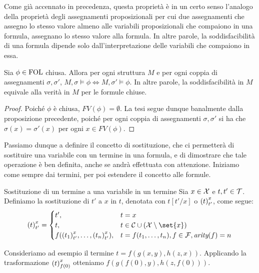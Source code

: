 Come già accennato in precedenza, questa proprietà è in un certo senso l'analogo della proprietà degli assegnamenti proposizionali per cui due assegnamenti che assegno lo stesso valore almeno alle variabili proposizionali che compaiono in una formula, assegnano lo stesso valore alla formula. In altre parole, la soddisfacibilità di una formula dipende solo dall'interpretazione delle variabili che compaiono in essa.

\begin{corollary}{}
  Sia \(\phi\in\FOL\) chiusa. Allora per ogni struttura \(M\) e per ogni coppia di assegnamenti \(\sigma, \sigma'\),  \(M,\sigma\models \phi \iff M,\sigma'\models \phi\). In altre parole, la soddisfacibilità in \(M\) equivale alla verità in \(M\) per le formule chiuse.
\end{corollary}

\begin{proof}
  Poiché \(\phi\) è chiusa, \(FV(\phi) = \emptyset\). La tesi segue dunque banalmente dalla proposizione precedente, poiché per ogni coppia di assegnamenti \(\sigma, \sigma'\) si ha che \(\sigma(x) = \sigma'(x)\) per ogni \(x \in FV(\phi)\).
\end{proof}

Passiamo dunque a definire il concetto di sostituzione, che ci permetterà di sostituire una variabile con un termine in una formula, e di dimostrare che tale operazione è ben definita, anche se andrà effettuata con attenzione. Iniziamo come sempre dai termini, per poi estendere il concetto alle formule.

\begin{definition}{Sostituzione di un termine a una variabile in un termine}
  Sia \(x\in\mathcal{X}\) e \(t,t' \in \mathcal{T}\). Definiamo la sostituzione di \(t'\) a \(x\) in \(t\), denotata con \(t[t'/x]\) o \({{\left(t\right)}^{x}_{t'}}\), come segue:
  \[\subs{t}{x}{t'} = \begin{cases}
    t', & t = x\\
    t, & t \in \ConstSyms \cup (\VarSyms\setminus\set{x})\\
    f(\subs{t_1}{x}{t'},\ldots,\subs{t_n}{x}{t'}), & t = f(t_1,\ldots,t_n), f\in\FuncSyms, \arty(f)=n
  \end{cases}\]
\end{definition}

Consideriamo ad esempio il termine \(t = f(g(x,y), h(z,x))\). Applicando la trasformazione \({{\left(t\right)}^{x}_{f(0)}}\) otteniamo \(f(g(f(0),y), h(z,f(0)))\).

